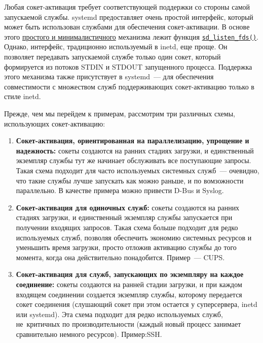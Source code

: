 \documentclass[10pt,oneside,a4paper]{article}
\newcommand{\hreftt}[2]{\href{#1}{\texttt{#2}}}
\begin{document}
Любая сокет-активация требует соответствующей поддержки со стороны самой
запускаемой службы. systemd предоставляет очень простой интерфейс, который может
быть использован службами для обеспечения сокет-активации. В основе этого
\href{http://0pointer.de/blog/projects/socket-activation.html}{простого и
минималистичного} механизма лежит функция
\hreftt{http://0pointer.de/public/systemd-man/sd_listen_fds.html}{sd\_listen\_fds()}.
Однако, интерфейс, традиционно используемый в inetd, еще проще. Он позволяет
передавать запускаемой службе только один сокет, который формируется из потоков
STDIN и STDOUT запущенного процесса. Поддержка этого механизма также
присутствует в systemd~--- для обеспечения совместимости с множеством служб
поддерживающих сокет-активацию только в стиле inetd.

Прежде, чем мы перейдем к примерам, рассмотрим три различных схемы, использующих
сокет-активацию:
\begin{enumerate}
	\item \textbf{Сокет-активация, ориентированная на параллелизацию,
		упрощение и надежность:} сокеты создаются на ранних стадиях
		загрузки, и единственный экземпляр службы тут же начинает
		обслуживать все поступающие запросы. Такая схема подходит для
		часто используемых системных служб~--- очевидно, что такие
		службы лучше запускать как можно раньше, и по вомзожности
		параллельно. В качестве примера можно привести D-Bus и Syslog.
	\item \textbf{Сокет-активация для одиночных служб:} сокеты создаются на
		ранних стадиях загрузки, и единственный экземпляр службы
		запускается при получении входящих запросов. Такая схема больше
		подходит для редко используемых служб, позволяя обеспечить
		экономию системных ресурсов и уменьшить время загрузки, просто
		отложив активацию службы до того момента, когда она
		действительно понадобится. Пример~--- CUPS.
	\item \textbf{Сокет-активация для служб, запускающих по экземпляру на
		каждое соединение:} сокеты создаются на ранней стадии загрузки,
		и при каждом входящем соединении создается экземпляр службы,
		которому передается сокет соединения (слушающий сокет при этом
		остается у суперсервера, inetd или systemd). Эта схема подходит
		для редко используемых служб, не~критичных по производительности
		(каждый новый процесс занимает сравнительно немного ресурсов).
		Пример:SSH.
\end{enumerate}
\end{document}
